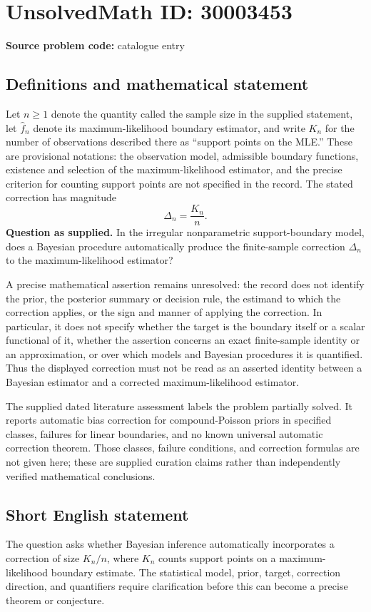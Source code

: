 \documentclass[11pt]{article}
\begin{document}
\section*{UnsolvedMath ID: 30003453}
\textbf{Source problem code:} catalogue entry
\subsection{Definitions and mathematical statement}
Let \(n\geq 1\) denote the quantity called the sample size in the supplied statement, let \(\widehat f_n\) denote its maximum-likelihood boundary estimator, and write \(K_n\) for the number of observations described there as ``support points on the MLE.'' These are provisional notations: the observation model, admissible boundary functions, existence and selection of the maximum-likelihood estimator, and the precise criterion for counting support points are not specified in the record. The stated correction has magnitude
\[
\Delta_n=\frac{K_n}{n}.
\]
\textbf{Question as supplied.} In the irregular nonparametric support-boundary model, does a Bayesian procedure automatically produce the finite-sample correction \(\Delta_n\) to the maximum-likelihood estimator?

A precise mathematical assertion remains unresolved: the record does not identify the prior, the posterior summary or decision rule, the estimand to which the correction applies, or the sign and manner of applying the correction. In particular, it does not specify whether the target is the boundary itself or a scalar functional of it, whether the assertion concerns an exact finite-sample identity or an approximation, or over which models and Bayesian procedures it is quantified. Thus the displayed correction must not be read as an asserted identity between a Bayesian estimator and a corrected maximum-likelihood estimator.

The supplied dated literature assessment labels the problem partially solved. It reports automatic bias correction for compound-Poisson priors in specified classes, failures for linear boundaries, and no known universal automatic correction theorem. Those classes, failure conditions, and correction formulas are not given here; these are supplied curation claims rather than independently verified mathematical conclusions.
\subsection{Short English statement}
The question asks whether Bayesian inference automatically incorporates a correction of size \(K_n/n\), where \(K_n\) counts support points on a maximum-likelihood boundary estimate. The statistical model, prior, target, correction direction, and quantifiers require clarification before this can become a precise theorem or conjecture.
\end{document}
